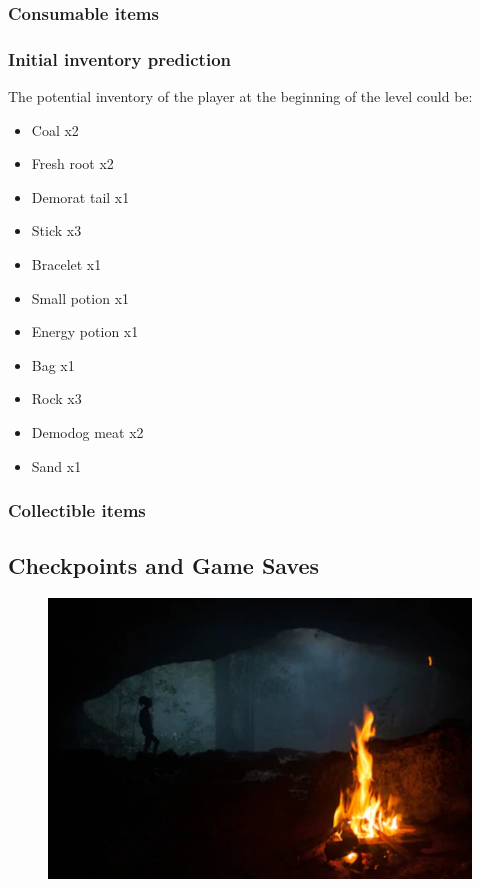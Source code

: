 \subsubsection{Consumable items}

\subsubsection{Initial inventory prediction}
The potential inventory of the player at the beginning of the level could be:
\begin{itemize}
	\item Coal x2
	\item Fresh root x2
	\item Demorat tail x1
	\item Stick x3
	\item Bracelet x1
	\item Small potion x1
	\item Energy potion x1
	\item Bag x1
	\item Rock x3
	\item Demodog meat x2
	\item Sand x1
\end{itemize}

\subsubsection{Collectible items}

\newpage

\subsection{Checkpoints and Game Saves}

\begin{figure}[H]
	\centering
	\includegraphics[width=14cm]{images/visual_ref/checkpoint.png}
\end{figure}

